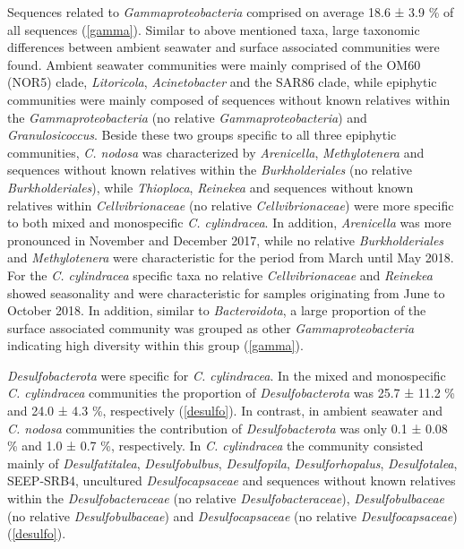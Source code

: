 \documentclass[
  12pt,
]{article}
\begin{document}
Sequences related to \emph{Gammaproteobacteria} comprised on average
18.6 ± 3.9 \si{\percent} of all sequences (\autoref{gamma}). Similar to
above mentioned taxa, large taxonomic differences between ambient
seawater and surface associated communities were found. Ambient seawater
communities were mainly comprised of the OM60 (NOR5) clade,
\emph{Litoricola}, \emph{Acinetobacter} and the SAR86 clade, while
epiphytic communities were mainly composed of sequences without known
relatives within the \emph{Gammaproteobacteria} (no relative
\emph{Gammaproteobacteria}) and \emph{Granulosicoccus}. Beside these two
groups specific to all three epiphytic communities, \emph{C. nodosa} was
characterized by \emph{Arenicella}, \emph{Methylotenera} and sequences
without known relatives within the \emph{Burkholderiales} (no relative
\emph{Burkholderiales}), while \emph{Thioploca}, \emph{Reinekea} and
sequences without known relatives within \emph{Cellvibrionaceae} (no
relative \emph{Cellvibrionaceae}) were more specific to both mixed and
monospecific \emph{C. cylindracea}. In addition, \emph{Arenicella} was
more pronounced in November and December 2017, while no relative
\emph{Burkholderiales} and \emph{Methylotenera} were characteristic for
the period from March until May 2018. For the \emph{C. cylindracea}
specific taxa no relative \emph{Cellvibrionaceae} and \emph{Reinekea}
showed seasonality and were characteristic for samples originating from
June to October 2018. In addition, similar to \emph{Bacteroidota}, a
large proportion of the surface associated community was grouped as
other \emph{Gammaproteobacteria} indicating high diversity within this
group (\autoref{gamma}).

\emph{Desulfobacterota} were specific for \emph{C. cylindracea}. In the
mixed and monospecific \emph{C. cylindracea} communities the proportion
of \emph{Desulfobacterota} was 25.7 ± 11.2 \si{\percent} and 24.0 ± 4.3
\si{\percent}, respectively (\autoref{desulfo}). In contrast, in ambient
seawater and \emph{C. nodosa} communities the contribution of
\emph{Desulfobacterota} was only 0.1 ± 0.08 \si{\percent} and 1.0 ± 0.7
\si{\percent}, respectively. In \emph{C. cylindracea} the community
consisted mainly of \emph{Desulfatitalea}, \emph{Desulfobulbus},
\emph{Desulfopila}, \emph{Desulforhopalus}, \emph{Desulfotalea},
SEEP-SRB4, uncultured \emph{Desulfocapsaceae} and sequences without
known relatives within the \emph{Desulfobacteraceae} (no relative
\emph{Desulfobacteraceae}), \emph{Desulfobulbaceae} (no relative
\emph{Desulfobulbaceae}) and \emph{Desulfocapsaceae} (no relative
\emph{Desulfocapsaceae}) (\autoref{desulfo}).
\end{document}
